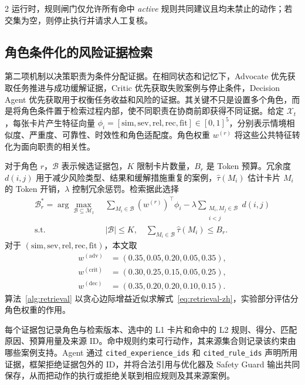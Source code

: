 \documentclass[10pt]{article}
\newcommand{\code}[1]{\texttt{#1}}
\begin{document}
\begin{multicols}{2}
运行时，规则闸门仅允许所有命中 \textit{active} 规则共同建议且均未禁止的动作；若交集为空，则停止执行并请求人工复核。

\subsection{角色条件化的风险证据检索}

第二项机制以决策职责为条件分配证据。在相同状态和记忆下，Advocate 优先获取任务推进与成功缓解证据，Critic 优先获取失败案例与停止条件，Decision Agent 优先获取用于权衡任务收益和风险的证据。其关键不只是设置多个角色，而是将角色条件置于检索过程内部，使不同职责在协商前即获得不同证据。给定 $\mathcal{X}_t$，每张卡片产生特征向量 $\phi_i=[\mathrm{sim},\mathrm{sev},\mathrm{rel},\mathrm{rec},\mathrm{fit}]\in[0,1]^5$，分别表示情境相似度、严重度、可靠性、时效性和角色适配度。角色权重 $w^{(r)}$ 将这些公共特征转化为面向职责的相关性。

对于角色 $r$，$\mathcal{B}$ 表示候选证据包，$K$ 限制卡片数量，$B_r$ 是 Token 预算。冗余度 $d(i,j)$ 用于减少风险类型、结果和缓解措施重复的案例，$\widehat{\tau}(M_i)$ 估计卡片 $M_i$ 的 Token 开销，$\lambda$ 控制冗余惩罚。检索据此选择
\begin{equation}
\begin{aligned}
\mathcal{B}_r^*=\arg\max_{\mathcal{B}\subseteq\mathcal{M}_t}\;&
\sum_{M_i\in\mathcal{B}}(w^{(r)})^\top\phi_i
-\lambda\!\sum_{\substack{M_i,M_j\in\mathcal{B}\\i<j}}d(i,j)\\
\text{s.t. }\;&|\mathcal{B}|\leq K,\quad
\sum_{M_i\in\mathcal{B}}\widehat{\tau}(M_i)\leq B_r .
\end{aligned}
\label{eq:retrieval-zh}
\end{equation}
对于 $(\mathrm{sim},\mathrm{sev},\mathrm{rel},\mathrm{rec},\mathrm{fit})$，本文取
\[
\begin{aligned}
w^{(\mathrm{adv})}&=(0.35,0.05,0.20,0.05,0.35),\\
w^{(\mathrm{crit})}&=(0.30,0.25,0.15,0.05,0.25),\\
w^{(\mathrm{dec})}&=(0.35,0.20,0.20,0.10,0.15).
\end{aligned}
\]
算法~\ref{alg:retrieval} 以贪心边际增益近似求解式~\eqref{eq:retrieval-zh}，实验部分评估分角色权重的作用。

每个证据包记录角色与检索版本、选中的 L1 卡片和命中的 L2 规则、得分、匹配原因、预算用量及来源 ID。命中规则约束可行动作，其来源集合则记录该约束由哪些案例支持。Agent 通过 \code{cited\_experience\_ids} 和 \code{cited\_rule\_ids} 声明所用证据，框架拒绝证据包外的 ID，并将合法引用与优化器及 Safety Guard 输出共同保存，从而把动作的执行或拒绝关联到相应规则及其来源案例。


\end{multicols}
\end{document}
